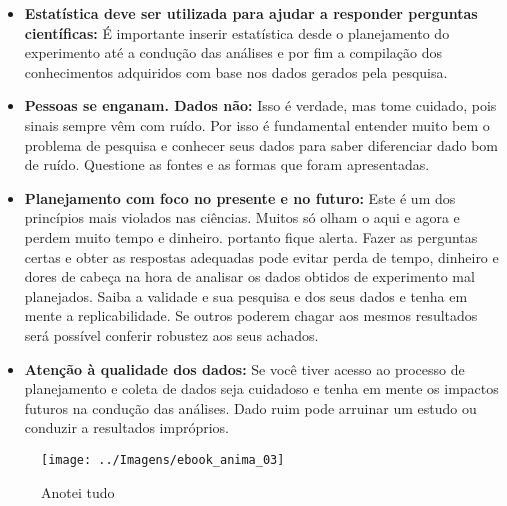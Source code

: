 \documentclass[11pt,]{style/krantz}
\theoremstyle{definition}
\theoremstyle{definition}
\theoremstyle{definition}
\theoremstyle{remark}
\begin{document}
\begin{itemize}
\item
  \textbf{Estatística deve ser utilizada para ajudar a responder perguntas científicas:} É importante inserir estatística desde o planejamento do experimento até a condução das análises e por fim a compilação dos conhecimentos adquiridos com base nos dados gerados pela pesquisa.
\item
  \textbf{Pessoas se enganam. Dados não:} Isso é verdade, mas tome cuidado, pois sinais sempre vêm com ruído. Por isso é fundamental entender muito bem o problema de pesquisa e conhecer seus dados para saber diferenciar dado bom de ruído. Questione as fontes e as formas que foram apresentadas.
\item
  \textbf{Planejamento com foco no presente e no futuro:} Este é um dos princípios mais violados nas ciências. Muitos só olham o aqui e agora e perdem muito tempo e dinheiro. portanto fique alerta. Fazer as perguntas certas e obter as respostas adequadas pode evitar perda de tempo, dinheiro e dores de cabeça na hora de analisar os dados obtidos de experimento mal planejados. Saiba a validade e sua pesquisa e dos seus dados e tenha em mente a replicabilidade. Se outros poderem chagar aos mesmos resultados será possível conferir robustez aos seus achados.
\item
  \textbf{Atenção à qualidade dos dados:} Se você tiver acesso ao processo de planejamento e coleta de dados seja cuidadoso e tenha em mente os impactos futuros na condução das análises. Dado ruim pode arruinar um estudo ou conduzir a resultados impróprios.
\end{itemize}

\begin{figure}[H]

{\centering \texttt{[image: ../Imagens/ebook\_anima\_03]}

}

\caption{Anotei tudo}\label{fig:fig03}
\end{figure}
\end{document}
